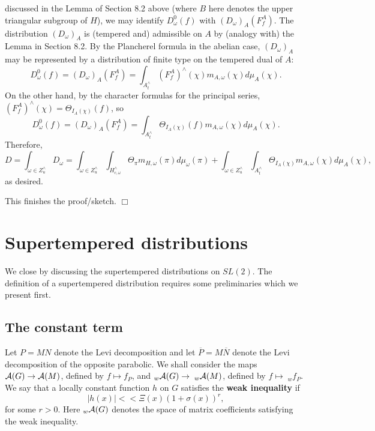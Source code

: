 \documentclass[11pt, a4paper]{article}
\begin{document}
discussed in the Lemma of Section 8.2 above (where $B$ here denotes the
upper triangular subgroup of $H$), we may identify $D_\omega ^0(f)$ with $%
(D_\omega )_A(F_f^A)$. The distribution $(D_\omega )_A$ is (tempered and)
admissible on $A$ by (analogy with) the Lemma in Section 8.2. By the
Plancherel formula in the abelian case, $(D_\omega )_A$ may be represented
by a distribution of finite type on the tempered dual of $A$:
\[
D_\omega ^0(f)=(D_\omega )_A(F_f^A)=\int_{A_t^{\wedge }}(F_f^A)^{\wedge
}(\chi )m_{A,\omega }(\chi )d\mu _A(\chi ).
\]
On the other hand, by the character formulas for the principal series, $%
(F_f^A)^{\wedge }(\chi )=\Theta _{I_A(\chi )}(f)$, so
\[
D_\omega ^0(f)=(D_\omega )_A(F_f^A)=\int_{A_t^{\wedge }}\Theta _{I_A(\chi
)}(f)m_{A,\omega }(\chi )d\mu _A(\chi ).
\]
Therefore,
\[
D=\int_{\omega \in Z_u^{\wedge }}D_\omega =\int_{\omega \in Z_u^{\wedge
}}\int_{H_{c,\omega }^{\wedge }}\Theta _\pi m_{H,\omega }(\pi )d\mu _\omega
(\pi )+\int_{\omega \in Z_u^{\wedge }}\int_{A_t^{\wedge }}\Theta _{I_A(\chi
)}m_{A,\omega }(\chi )d\mu _A(\chi ),
\]
as desired.

This finishes the proof/sketch. $\Box $

\section{Supertempered distributions}

We close by discussing the supertempered distributions on $SL(2)$. The
definition of a supertempered distribution requires some preliminaries which
we present first.

\subsection{The constant term}

Let $P=MN$ denote the Levi decomposition and let $\overline{P}=M\overline{N}$
denote the Levi decomposition of the opposite parabolic. We shall consider
the maps ${\cal A}(G)\rightarrow {\cal A}(M)$, defined by $f\longmapsto
f_P$, and $_w{\cal A}(G)\rightarrow \;_w{\cal A}(M)$, defined by $f\longmapsto
\;_wf_P$. We say that a locally constant function $h$ on $G$ satisfies the 
{\bf weak inequality} if
\[
|h(x)|<<\Xi (x)(1+\sigma (x))^r,
\]
for some $r>0$. Here $_w{\cal A}(G)$ denotes the space of matrix
coefficients satisfying the weak inequality.
\end{document}
